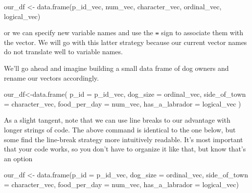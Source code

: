 \documentclass[
  letterpaper,
  DIV=11,
  numbers=noendperiod]{scrreprt}
\newenvironment{Shaded}{\begin{snugshade}}{\end{snugshade}}
\newcommand{\AttributeTok}[1]{\textcolor[rgb]{0.40,0.45,0.13}{#1}}
\newcommand{\FunctionTok}[1]{\textcolor[rgb]{0.28,0.35,0.67}{#1}}
\newcommand{\NormalTok}[1]{\textcolor[rgb]{0.00,0.23,0.31}{#1}}
\newcommand{\OtherTok}[1]{\textcolor[rgb]{0.00,0.23,0.31}{#1}}
\begin{document}
\begin{Shaded}
\begin{Highlighting}[]
\NormalTok{our\_df }\OtherTok{\textless{}{-}} \FunctionTok{data.frame}\NormalTok{(p\_id\_vec, num\_vec, character\_vec, ordinal\_vec, logical\_vec)}
\end{Highlighting}
\end{Shaded}

or we can specify new variable names and use the \texttt{=} sign to
associate them with the vector. We will go with this latter strategy
because our current vector names do not translate well to variable
names.

We'll go ahead and imagine building a small data frame of dog owners and
rename our vectors accordingly.

\begin{Shaded}
\begin{Highlighting}[]
\NormalTok{our\_df}\OtherTok{\textless{}{-}}\FunctionTok{data.frame}\NormalTok{(}
  \AttributeTok{p\_id =}\NormalTok{ p\_id\_vec,}
  \AttributeTok{dog\_size =}\NormalTok{ ordinal\_vec,}
  \AttributeTok{side\_of\_town =}\NormalTok{ character\_vec,}
  \AttributeTok{food\_per\_day =}\NormalTok{ num\_vec, }
  \AttributeTok{has\_a\_labrador =}\NormalTok{ logical\_vec}
\NormalTok{)}
\end{Highlighting}
\end{Shaded}

\begin{tcolorbox}[enhanced jigsaw, title=\textcolor{quarto-callout-tip-color}{\faLightbulb}\hspace{0.5em}{Tip}, left=2mm, opacitybacktitle=0.6, colframe=quarto-callout-tip-color-frame, bottomrule=.15mm, coltitle=black, colbacktitle=quarto-callout-tip-color!10!white, toptitle=1mm, bottomtitle=1mm, breakable, arc=.35mm, colback=white, opacityback=0, titlerule=0mm, rightrule=.15mm, leftrule=.75mm, toprule=.15mm]

As a slight tangent, note that we can use line breaks to our advantage
with longer strings of code. The above command is identical to the one
below, but some find the line-break strategy more intuitively readable.
It's most important that your code works, so you don't have to organize
it like that, but know that's an option

\begin{Shaded}
\begin{Highlighting}[]
\NormalTok{our\_df }\OtherTok{\textless{}{-}} \FunctionTok{data.frame}\NormalTok{(}\AttributeTok{p\_id =}\NormalTok{ p\_id\_vec, }\AttributeTok{dog\_size =}\NormalTok{ ordinal\_vec, }\AttributeTok{side\_of\_town =}\NormalTok{ character\_vec, }\AttributeTok{food\_per\_day =}\NormalTok{ num\_vec, }\AttributeTok{has\_a\_labrador =}\NormalTok{ logical\_vec)}
\end{Highlighting}
\end{Shaded}

\end{tcolorbox}
\end{document}
